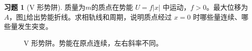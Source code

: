 \documentclass[11pt,openany,fontset=fandol]{ctexbook}
\theoremstyle{definition}\newtheorem{example}{例}[chapter]\newtheorem{exercise}{习题}[chapter]
\begin{document}
\par\medskip\noindent\begin{minipage}{\textwidth}
\begin{exercise}[V 形势阱]\label{mp4:exercise:l4-h2}
质量为$m$的质点在势能 $U=f|x|$ 中运动，$f>0$。最大位移为 $A$，图\ref{mp4:fig:l4-h2-q}给出势能折线。求相轨线和周期，说明质点经过 $x=0$ 时哪些量连续、哪些量发生突变。
\end{exercise}

\begin{figure}[H]\centering
{}
\caption{V 形势阱。势能在原点连续，左右斜率不同。}\label{mp4:fig:l4-h2-q}
\end{figure}
\end{minipage}\par\medskip
\end{document}

